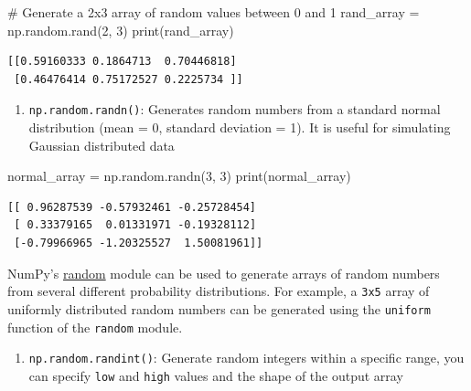 \documentclass[
  letterpaper,
  DIV=11,
  numbers=noendperiod]{scrreprt}
\newenvironment{Shaded}{\begin{snugshade}}{\end{snugshade}}
\newcommand{\BuiltInTok}[1]{\textcolor[rgb]{0.00,0.23,0.31}{#1}}
\newcommand{\CommentTok}[1]{\textcolor[rgb]{0.37,0.37,0.37}{#1}}
\newcommand{\DecValTok}[1]{\textcolor[rgb]{0.68,0.00,0.00}{#1}}
\newcommand{\NormalTok}[1]{\textcolor[rgb]{0.00,0.23,0.31}{#1}}
\newcommand{\OperatorTok}[1]{\textcolor[rgb]{0.37,0.37,0.37}{#1}}
\providecommand{\tightlist}{%
  \setlength{\itemsep}{0pt}\setlength{\parskip}{0pt}}\usepackage{longtable,booktabs,array}
\begin{document}
\begin{Shaded}
\begin{Highlighting}[]
\CommentTok{\# Generate a 2x3 array of random values between 0 and 1}
\NormalTok{rand\_array }\OperatorTok{=}\NormalTok{ np.random.rand(}\DecValTok{2}\NormalTok{, }\DecValTok{3}\NormalTok{)}
\BuiltInTok{print}\NormalTok{(rand\_array)}
\end{Highlighting}
\end{Shaded}

\begin{verbatim}
[[0.59160333 0.1864713  0.70446818]
 [0.46476414 0.75172527 0.2225734 ]]
\end{verbatim}

\begin{enumerate}
\def\labelenumi{\arabic{enumi}.}
\setcounter{enumi}{1}
\tightlist
\item
  \texttt{np.random.randn()}: Generates random numbers from a standard
  normal distribution (mean = 0, standard deviation = 1). It is useful
  for simulating Gaussian distributed data
\end{enumerate}

\begin{Shaded}
\begin{Highlighting}[]
\NormalTok{normal\_array }\OperatorTok{=}\NormalTok{ np.random.randn(}\DecValTok{3}\NormalTok{, }\DecValTok{3}\NormalTok{)}
\BuiltInTok{print}\NormalTok{(normal\_array)}
\end{Highlighting}
\end{Shaded}

\begin{verbatim}
[[ 0.96287539 -0.57932461 -0.25728454]
 [ 0.33379165  0.01331971 -0.19328112]
 [-0.79966965 -1.20325527  1.50081961]]
\end{verbatim}

NumPy's
\href{https://numpy.org/doc/stable/reference/random/index.html}{random}
module can be used to generate arrays of random numbers from several
different probability distributions. For example, a \texttt{3x5} array
of uniformly distributed random numbers can be generated using the
\texttt{uniform} function of the \texttt{random} module.

\begin{enumerate}
\def\labelenumi{\arabic{enumi}.}
\setcounter{enumi}{2}
\tightlist
\item
  \texttt{np.random.randint()}: Generate random integers within a
  specific range, you can specify \texttt{low} and \texttt{high} values
  and the shape of the output array
\end{enumerate}
\end{document}
